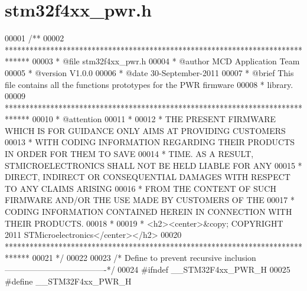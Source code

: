 \section{stm32f4xx\+\_\+pwr.\+h}
\label{stm32f4xx__pwr_8h_source}

\begin{DoxyCode}
00001 \textcolor{comment}{/**}
00002 \textcolor{comment}{  ******************************************************************************}
00003 \textcolor{comment}{  * @file    stm32f4xx\_pwr.h}
00004 \textcolor{comment}{  * @author  MCD Application Team}
00005 \textcolor{comment}{  * @version V1.0.0}
00006 \textcolor{comment}{  * @date    30-September-2011}
00007 \textcolor{comment}{  * @brief   This file contains all the functions prototypes for the PWR firmware }
00008 \textcolor{comment}{  *          library.}
00009 \textcolor{comment}{  ******************************************************************************}
00010 \textcolor{comment}{  * @attention}
00011 \textcolor{comment}{  *}
00012 \textcolor{comment}{  * THE PRESENT FIRMWARE WHICH IS FOR GUIDANCE ONLY AIMS AT PROVIDING CUSTOMERS}
00013 \textcolor{comment}{  * WITH CODING INFORMATION REGARDING THEIR PRODUCTS IN ORDER FOR THEM TO SAVE}
00014 \textcolor{comment}{  * TIME. AS A RESULT, STMICROELECTRONICS SHALL NOT BE HELD LIABLE FOR ANY}
00015 \textcolor{comment}{  * DIRECT, INDIRECT OR CONSEQUENTIAL DAMAGES WITH RESPECT TO ANY CLAIMS ARISING}
00016 \textcolor{comment}{  * FROM THE CONTENT OF SUCH FIRMWARE AND/OR THE USE MADE BY CUSTOMERS OF THE}
00017 \textcolor{comment}{  * CODING INFORMATION CONTAINED HEREIN IN CONNECTION WITH THEIR PRODUCTS.}
00018 \textcolor{comment}{  *}
00019 \textcolor{comment}{  * <h2><center>&copy; COPYRIGHT 2011 STMicroelectronics</center></h2>}
00020 \textcolor{comment}{  ******************************************************************************}
00021 \textcolor{comment}{  */}
00022 
00023 \textcolor{comment}{/* Define to prevent recursive inclusion -------------------------------------*/}
00024 \textcolor{preprocessor}{#}\textcolor{preprocessor}{ifndef} \textcolor{preprocessor}{\_\_STM32F4xx\_PWR\_H}
00025 \textcolor{preprocessor}{#}\textcolor{preprocessor}{define} \textcolor{preprocessor}{\_\_STM32F4xx\_PWR\_H}

\end{DoxyCode}
